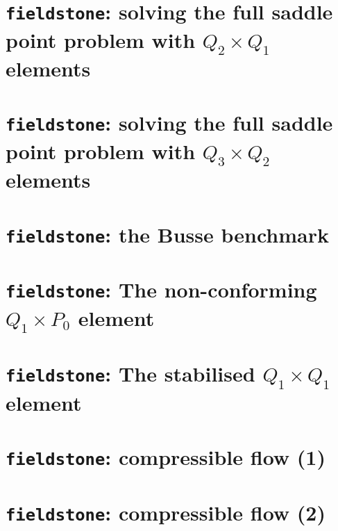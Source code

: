 \documentclass[a4paper]{article}
\begin{document}
\newpage
\section{{\tt fieldstone}: solving the full saddle point problem with $Q_2\times Q_1$ elements}


\newpage
\section{{\tt fieldstone}: solving the full saddle point problem with $Q_3\times Q_2$ elements}


\newpage
\section{{\tt fieldstone}: the Busse benchmark}



\newpage
\section{{\tt fieldstone}: The non-conforming $Q_1 \times P_0$ element} \label{ncq1p0} 


\newpage
\section{{\tt fieldstone}: The stabilised $Q_1 \times Q_1$ element} 


\newpage
\section{{\tt fieldstone}: compressible flow (1)}


\newpage
\section{{\tt fieldstone}: compressible flow (2)}

\end{document}
